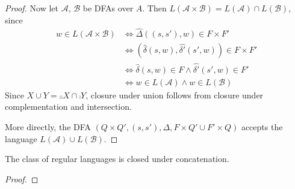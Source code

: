 \begin{proof}
    Now let $\mathcal{A}$, $\mathcal{B}$ be DFAs over $A$.
    Then $L(\mathcal{A} \times \mathcal{B})
    = L(\mathcal{A}) \cap L(\mathcal{B})$, since
    \begin{align*}
        w \in L(\mathcal{A} \times \mathcal{B})
            &\iff \hat{\Delta}((s, s'), w) \in F \times F' \\
            &\iff (\hat{\delta}(s, w), \hat{\delta'}(s', w)) \in F \times F' \\
            &\iff \hat{\delta}(s, w) \in F \land \hat{\delta'}(s', w) \in F' \\
            &\iff w \in L(\mathcal{A}) \land w \in L(\mathcal{B})
    \end{align*}
    Since $X \cup Y = \comp{\comp{X} \cap \comp{Y}}$, closure under union
    follows from closure under complementation and intersection.

    More directly, the DFA
    $(Q \times Q', (s, s'), \Delta, F \times Q' \cup F' \times Q)$
    accepts the language $L(\mathcal{A}) \cup L(\mathcal{B})$.
\end{proof}

\begin{theorem} \label{thm:dfa:regular:closure2}
    The class of regular languages is closed under concatenation.
\end{theorem}
\begin{proof}
    
\end{proof}
